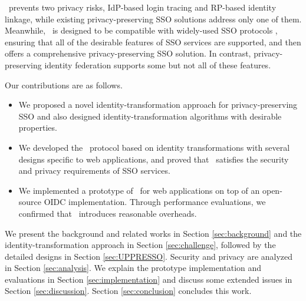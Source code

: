 
\usso~prevents two privacy risks, IdP-based login tracing and RP-based identity linkage, while existing privacy-preserving SSO solutions \cite{BrowserID, SPRESSO, NIST2017draft, FirefoxAccount} address only one of them. Meanwhile, \usso~is designed to be compatible with widely-used SSO protocols \cite{OpenIDConnect, rfc6749, SAML, NIST2017draft}, ensuring that all of the desirable features of SSO services are supported, and then offers a comprehensive privacy-preserving SSO solution.
In contrast, privacy-preserving identity federation \cite{PseudoID, ELPASSO, UnlimitID, Opaak, uprov, hyperledge-idemix} supports some but not all of these features.

Our contributions are as follows.
\vspace{-\topsep}\begin{itemize}
\setlength{\topsep}{0pt}
\setlength{\partopsep}{0pt}
\setlength{\itemsep}{0pt}
\setlength{\parsep}{0pt}
\setlength{\parskip}{0pt}
\item We proposed a novel identity-transformation approach for privacy-preserving SSO and also designed identity-transformation algorithms with desirable properties.
\item We developed the \usso~protocol based on identity transformations with several designs specific to web applications, and proved that \usso~satisfies the security and privacy requirements of SSO services.
\item We implemented a prototype of \usso~for web applications on top of an open-source OIDC implementation. Through performance evaluations, we confirmed that \usso~introduces reasonable overheads.
\end{itemize}


We present the background and related works in Section \ref{sec:background} and the identity-transformation approach in Section \ref{sec:challenge}, followed by the detailed designs in Section \ref{sec:UPPRESSO}.
Security and privacy are analyzed in Section \ref{sec:analysis}. We explain the prototype implementation and evaluations in Section \ref{sec:implementation} and discuss some extended issues in Section \ref{sec:discussion}. Section \ref{sec:conclusion} concludes this work.
